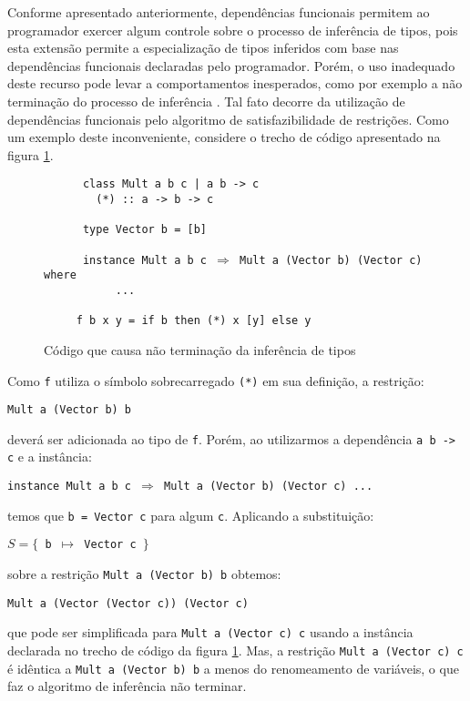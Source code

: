 Conforme apresentado anteriormente, depend\^encias funcionais permitem ao programador exercer algum controle sobre o 
processo de infer\^encia de tipos, pois esta extens\~ao permite a especializa\c{c}\~ao de tipos inferidos com base nas
depend\^encias funcionais declaradas pelo programador. Por\'em, o uso inadequado deste recurso pode levar a
comportamentos inesperados, como por exemplo a n\~ao termina\c{c}\~ao do processo de infer\^encia \cite{Sulzmann06a}.
Tal fato decorre da utiliza\c{c}\~ao de depend\^encias funcionais pelo algoritmo de satisfazibilidade de 
restri\c{c}\~oes. Como um exemplo deste inconveniente, considere o trecho de c\'odigo apresentado na figura 
\ref{nonend}.
\begin{figure}[h]
	\begin{flushleft}
\verb|	    |\texttt{class Mult a b c | a b -> c}\\
\verb|        |\texttt{(*) :: a -> b -> c}\\
\verb|  |\\   
\verb|	    |\texttt{type Vector b = [b]}\\
\verb|  |\\
\verb|	    |\texttt{instance Mult a b c $\Rightarrow$ Mult a (Vector b) (Vector c) where}\\ 
\verb|   	     |\texttt{...}\\
\verb|  |\\
\verb|     |\texttt{f b x y = if b then (*) x [y] else y}
	\end{flushleft}
	\centering
	\caption{C\'odigo que causa n\~ao termina\c{c}\~ao da infer\^encia de tipos}
	\label{nonend}
\end{figure}
Como \texttt{f} utiliza o s\'imbolo sobrecarregado \texttt{(*)} em sua defini\c{c}\~ao, a restri\c{c}\~ao:
\begin{center}
	\texttt{Mult a (Vector b) b} 
\end{center}
dever\'a ser adicionada ao tipo de \texttt{f}. Por\'em, ao utilizarmos a depend\^encia \texttt{a b -> c} e
a inst\^ancia:
\begin{center}
\texttt{instance Mult a b c $\Rightarrow$ Mult a (Vector b) (Vector c) ...}
\end{center}
temos que \texttt{b = Vector c} para algum \texttt{c}. Aplicando a substitui\c{c}\~ao:
\begin{center} 
	\texttt{$S=\{$ b $\mapsto$ Vector c $\}$}
\end{center}
sobre a restri\c{c}\~ao \texttt{Mult a (Vector b) b} obtemos:
\begin{center}
 \texttt{Mult a (Vector (Vector c)) (Vector c)}
\end{center} 
que pode ser simplificada para \texttt{Mult a (Vector c) c} usando a inst\^ancia declarada no trecho de c\'odigo 
da figura \ref{nonend}. Mas, a restri\c{c}\~ao \texttt{Mult a (Vector c) c}  \'e id\^entica a 
\texttt{Mult a (Vector b) b} a menos do renomeamento de vari\'aveis, o que faz o algoritmo de infer\^encia n\~ao
terminar. 

